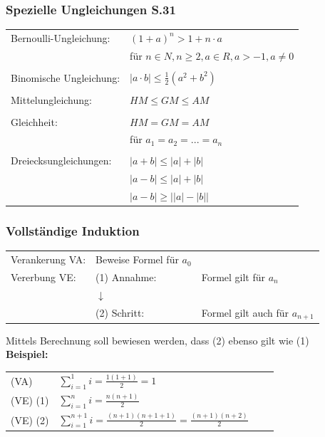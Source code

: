 		\subsubsection{Spezielle Ungleichungen S.31}
			\begin{tabular}{ll} 
				Bernoulli-Ungleichung: & $(1 + a)^n > 1 + n \cdot a$\\
				                       & für $n \in N, n \geq 2, a \in R, a > -1, a\neq0$ \\
				\\
				Binomische Ungleichung: & $|a\cdot b|\leq\frac{1}{2}(a^2 + b^2)$\\ 
				\\
				Mittelungleichung: & $ HM \leq GM \leq AM $\\
				\\
				Gleichheit: & $ HM = GM = AM$ \\
				            & für $a_1 = a_2 = ... = a_n$ \\
				\\
				Dreiecksungleichungen: & $\left|a+b\right|\leq\left|a\right|+\left|b\right|$ \\
				                       & 	$\left|a-b\right|\leq\left|a\right|+\left|b\right|$  \\
				                       & $\left|a-b\right|\geq\left|\left|a\right|-\left|b\right|\right|$ \\
			\end{tabular}
				
		\subsubsection{Vollständige Induktion}	
			\begin{tabular}{lll} 
				Verankerung VA: & Beweise Formel für $a_0$ & \\
				Vererbung VE:   & (1) Annahme: & Formel gilt für $a_n$ \\
				                & $\downarrow$ & \\
				                & (2) Schritt: & Formel gilt auch für $a_{n+1}$ \\
			\end{tabular}
				
			Mittels Berechnung soll bewiesen werden, dass (2) ebenso gilt wie (1) \\

			\textbf{Beispiel:} \\
			
			\begin{tabular}{llll} 
				(VA) & $\sum \limits_{i=1}^1 i = \frac{1(1+1)}{2} = 1 $ \\
				(VE) (1) & $\sum \limits_{i=1}^n i = \frac{n(n+1)}{2}$  \\
				(VE) (2) & $\sum \limits_{i=1}^{n+1} i = \frac{(n+1)(n+1 + 1)}{2} = \frac{(n+1)(n+2)}{2} $  \\
			\end{tabular}
	
